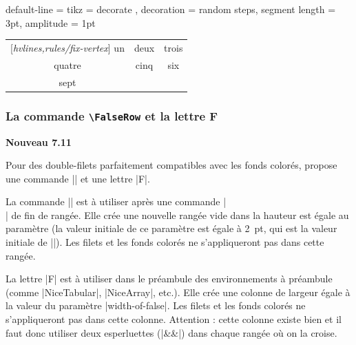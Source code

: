 \documentclass[dvipsnames]{article}
\begin{document}
\bigskip
\begin{scope}
\NiceMatrixOptions
  {
    default-line =
      {
        tikz =
          {
            decorate ,
            decoration = { random steps, segment length = 3pt, amplitude = 1pt }
          }
      }
  }

\renewcommand{\arraystretch}{1.3}

\begin{Code}[width=11cm,show-output,no-cell-nodes]
\renewcommand{\arraystretch}{1.3}
\begin{NiceTabular}{ccc}[\emph{hvlines,rules/fix-vertex}]
un     & deux & trois \\
quatre & cinq & six \\
sept   &  \\
\end{NiceTabular}
\end{Code}

\end{scope}


\subsubsection{La commande \texttt{\textbackslash FalseRow} et la lettre F}

\label{FalseRow}

\colorbox{yellow!50}{\textbf{Nouveau 7.11}}

\nobreak
\smallskip
Pour des double-filets parfaitement compatibles avec les fonds colorés, 
propose une commande |\FalseRow| et une lettre |F|.

\smallskip
La commande |\FalseRow| est à utiliser après une commande |\\| de fin de rangée.
Elle crée une nouvelle rangée vide dans la hauteur est égale au paramètre
 (la valeur initiale de ce paramètre est égale à
2~pt, qui est la valeur initiale de |\doublerulesep|). Les filets et les fonds
colorés ne s'appliqueront pas dans cette rangée.

\smallskip
La lettre |F| est à utiliser dans le préambule des environnements à préambule
(comme |{NiceTabular}|, |{NiceArray}|, etc.). Elle crée une colonne de largeur
égale à la valeur du paramètre |width-of-false|. Les filets et les fonds colorés
ne s'appliqueront pas dans cette colonne. Attention : cette colonne existe bien
et il faut donc utiliser deux esperluettes (|&&|) dans chaque rangée où on la
croise.
\end{document}
